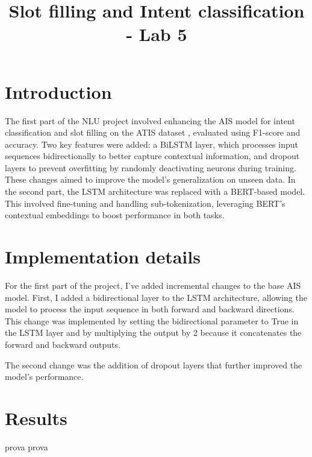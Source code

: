 \documentclass[a4paper]{article}
\title{Slot filling and Intent classification  - Lab 5}
\begin{document}
\maketitle
%
%
\section{Introduction}
The first part of the NLU project involved enhancing the AIS model for intent 
classification and slot filling on the ATIS dataset \cite{nlu-labs-unitn}, evaluated using F1-score and
 accuracy. Two key features were added: a BiLSTM layer, which processes input 
 sequences bidirectionally to better capture contextual information, and dropout 
 layers to prevent overfitting by randomly deactivating neurons during training.
 These changes aimed to improve the model’s generalization on unseen data. In the 
 second part, the LSTM architecture was replaced with a BERT-based model. This 
 involved fine-tuning and handling sub-tokenization, leveraging BERT’s contextual
 embeddings to boost performance in both tasks.
\section{Implementation details}
For the first part of the project, I've added incremental changes to the base AIS model.
First, I added a bidirectional layer to the LSTM architecture, allowing the model to
process the input sequence in both forward and backward directions. 
This change was implemented by setting the bidirectional parameter to True in the LSTM layer and by multiplying the output
 by 2 because it concatenates the forward and backward outputs.

The second change was the addition of dropout layers that further improved the model's performance.

\section{Results}

prova prova



\end{document}
